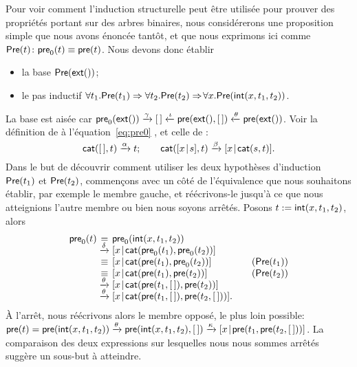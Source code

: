 Pour voir comment l'induction structurelle peut être utilisée pour
prouver des propriétés portant sur des arbres binaires, nous
considérerons une proposition simple que nous avons énoncée tantôt, et
que nous exprimons ici comme \(\textsf{Pre}({t}) \colon \textsf{pre}_0(t)
\equiv
\textsf{pre}(t)\).
Nous devons donc établir
\begin{itemize}

  \item la base \(\textsf{Pre}({\textsf{ext}()})\);

  \item le pas inductif \(\forall t_1.\textsf{Pre}({t_1}) \Rightarrow
    \forall t_2.\textsf{Pre}({t_2}) \Rightarrow \! \forall
    x.\textsf{Pre}({\textsf{int}(x,t_1,t_2)})\).

\end{itemize}
La base est aisée car \(\textsf{pre}_0(\textsf{ext}())
\xrightarrow{\smash{\gamma}} [\,] \xleftarrow{\smash{\iota}}
\textsf{pre}(\textsf{ext}(),[\,]) \xleftarrow{\smash{\theta}}
\textsf{pre}(\textsf{ext}())\). Voir la définition de  à
l'équation~\eqref{eq:pre0} , et celle de
:
\begin{equation*}
\textsf{cat}([\,],t) \xrightarrow{\smash{\alpha}} t;
\qquad
\textsf{cat}([{x}\!\mid\!{s}],t) \xrightarrow{\smash{\beta}}
[{x}\!\mid\!{\textsf{cat}(s,t)}].
\end{equation*}
Dans le but de découvrir comment utiliser les deux hypothèses
d'induction \(\textsf{Pre}({t_1})\) et
\(\textsf{Pre}({t_2})\), commençons avec un côté
de l'équivalence que nous souhaitons établir, par exemple le membre
gauche, et réécrivons-le jusqu'à ce que nous atteignions l'autre
membre ou bien nous soyons arrêtés. Posons \(t :=
\textsf{int}(x,t_1,t_2)\), alors
\begin{equation*}
\begin{array}{@{}r@{\;}c@{\;}l@{\qquad}r@{}}
\fun{pre}_0(t)
& = & \fun{pre}_0(\fun{int}(x,t_1,t_2))\\
& \xrightarrow{\smash{\delta}}
& \cons{x}{\fun{cat}(\fun{pre}_0(t_1), \fun{pre}_0(t_2))}\\
& \equiv & \cons{x}{\fun{cat}(\fun{pre}(t_1), \fun{pre}_0(t_2))}
& (\pred{Pre}{t_1})\\
& \equiv & \cons{x}{\fun{cat}(\fun{pre}(t_1), \fun{pre}(t_2))}
& (\pred{Pre}{t_2})\\
& \xrightarrow{\smash{\theta}}
& \cons{x}{\fun{cat}(\fun{pre}(t_1,\el), \fun{pre}(t_2))}\\
& \xrightarrow{\smash{\theta}}
& \cons{x}{\fun{cat}(\fun{pre}(t_1,\el), \fun{pre}(t_2,\el))}.
\end{array}
\end{equation*}
À l'arrêt, nous réécrivons alors le membre opposé, le plus loin
possible: \(\textsf{pre}(t) = \textsf{pre}(\textsf{int}(x,t_1,t_2))
\xrightarrow{\smash{\theta}} \textsf{pre}(\textsf{int}(x,t_1,t_2),[\,])
\xrightarrow{\smash{\kappa}}
[{x}\!\mid\!{\textsf{pre}(t_1,\textsf{pre}(t_2,[\,]))}]\). La
comparaison des deux expressions sur lesquelles nous nous sommes
arrêtés suggère un sous-but à atteindre.

